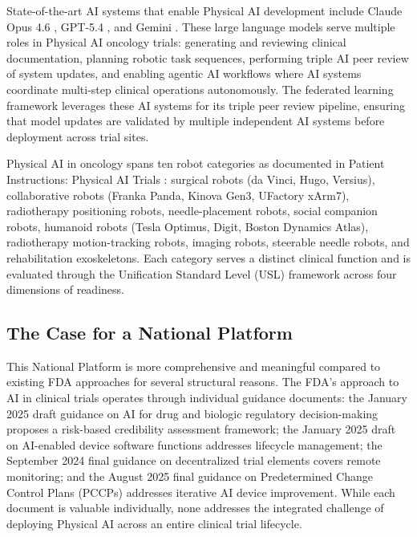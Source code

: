 State-of-the-art AI systems that enable Physical AI development include Claude
Opus 4.6 \cite{claude-opus}, GPT-5.4 \cite{gpt-5-4}, and Gemini
\cite{gemini}. These large language models serve multiple roles in Physical AI
oncology trials: generating and reviewing clinical documentation, planning
robotic task sequences, performing triple AI peer review of system updates, and
enabling agentic AI workflows where AI systems coordinate multi-step clinical
operations autonomously. The federated learning framework \cite{fl-paper}
leverages these AI systems for its triple peer review pipeline, ensuring that
model updates are validated by multiple independent AI systems before
deployment across trial sites.

Physical AI in oncology spans ten robot categories as documented in Patient
Instructions: Physical AI Trials \cite{patient-instructions-paper}: surgical
robots (da Vinci, Hugo, Versius), collaborative robots (Franka Panda, Kinova
Gen3, UFactory xArm7), radiotherapy positioning robots, needle-placement
robots, social companion robots, humanoid robots (Tesla Optimus, Digit, Boston
Dynamics Atlas), radiotherapy motion-tracking robots, imaging robots, steerable
needle robots, and rehabilitation exoskeletons. Each category serves a distinct
clinical function and is evaluated through the Unification Standard Level (USL)
framework \cite{usl-standard} across four dimensions of readiness.

\subsection{The Case for a National Platform}
\label{subsec:case-national}

This National Platform is more comprehensive and meaningful compared to
existing FDA approaches for several structural reasons. The FDA's approach to
AI in clinical trials operates through individual guidance documents: the
January 2025 draft guidance on AI for drug and biologic regulatory
decision-making proposes a risk-based credibility assessment framework; the
January 2025 draft on AI-enabled device software functions addresses lifecycle
management; the September 2024 final guidance on decentralized trial elements
covers remote monitoring; and the August 2025 final guidance on Predetermined
Change Control Plans (PCCPs) addresses iterative AI device improvement. While
each document is valuable individually, none addresses the integrated
challenge of deploying Physical AI across an entire clinical trial lifecycle.

